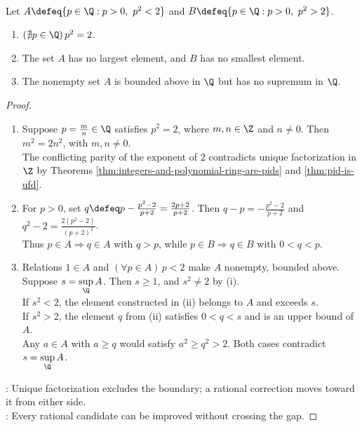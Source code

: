 \begin{proposition} \label{prop:rational-square-root-two-gap} \\
Let $A\defeq\{p\in\Q:p>0,\ p^2<2\}$ and $B\defeq\{p\in\Q:p>0,\ p^2>2\}$.
\begin{enumerate}[label=(\roman*)]
\setlength{\itemsep}{0pt}
\item $(\nexists p\in\Q)\,p^2=2$.
\item The set $A$ has no largest element, and $B$ has no smallest element.
\item The nonempty set $A$ is bounded above in $\Q$ but has no supremum in $\Q$.
\end{enumerate}
\begin{proof}
\begin{enumerate}[label=(\roman*)]
\setlength{\itemsep}{0pt}
\item Suppose $p=\frac{m}{n}\in\Q$ satisfies $p^2=2$, where $m,n\in\Z$ and $n\neq0$. Then $m^2=2n^2$, with $m,n\neq0$.\\
The conflicting parity of the exponent of $2$ contradicts unique factorization in $\Z$ by Theorems \ref{thm:integers-and-polynomial-ring-are-pids} and \ref{thm:pid-is-ufd}.
\item For $p>0$, set $q\defeq p-\frac{p^2-2}{p+2}=\frac{2p+2}{p+2}$. Then $q-p=-\frac{p^2-2}{p+2}$ and $q^2-2=\frac{2(p^2-2)}{(p+2)^2}$.\\
Thus $p\in A\Rightarrow q\in A$ with $q>p$, while $p\in B\Rightarrow q\in B$ with $0<q<p$.
\item Relations $1\in A$ and $(\forall p\in A)\,p<2$ make $A$ nonempty, bounded above. Suppose $s=\sup\limits_{\Q}A$. Then $s\geq1$, and $s^2\neq2$ by (i).\\
If $s^2<2$, the element constructed in (ii) belongs to $A$ and exceeds $s$.\\
If $s^2>2$, the element $q$ from (ii) satisfies $0<q<s$ and is an upper bound of $A$.\\
Any $a\in A$ with $a\geq q$ would satisfy $a^2\geq q^2>2$. Both cases contradict $s=\sup\limits_{\Q}A$.
\end{enumerate}
: Unique factorization excludes the boundary; a rational correction moves toward it from either side.\\
: Every rational candidate can be improved without crossing the gap.
\end{proof}
\end{proposition}

